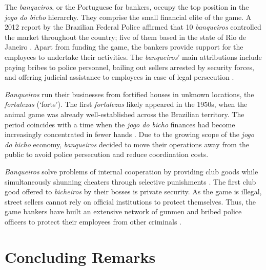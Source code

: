 \documentclass[a4paper,12pt]{article}
\begin{document}
The \textit{banqueiros}, or the Portuguese for bankers, occupy the top position in the \textit{jogo do bicho} hierarchy. They comprise the small financial elite of the game. A 2012 report by the Brazilian Federal Police affirmed that 10 \textit{banqueiros} controlled the market throughout the country; five of them based in the state of Rio de Janeiro \citep{globo2012contraventores}. Apart from funding the game, the bankers provide support for the employees to undertake their activities. The \textit{banqueiros}' main attributions include paying bribes to police personnel, bailing out sellers arrested by security forces, and offering judicial assistance to employees in case of legal persecution \citep[75]{labronici2012paratodos}.

\textit{Banqueiros} run their businesses from fortified houses in unknown locations, the \textit{fortalezas} (`forts'). The first \textit{fortalezas} likely appeared in the 1950s, when the animal game was already well-established across the Brazilian territory. The period coincides with a time when the \textit{jogo do bicho} finances had become increasingly concentrated in fewer hands \citep[259]{chazkel2011laws}. Due to the growing scope of the \textit{jogo do bicho} economy, \textit{banqueiros} decided to move their operations away from the public to avoid police persecution and reduce coordination costs.

\textit{Banqueiros} solve problems of internal cooperation by providing club goods \citep{buchanan1965economic} while simultaneously shunning cheaters through selective punishments \citep{bo2005cooperation, roth1978equilibrium}. The first club good offered to \textit{bicheiros} by their bosses is private security. As the game is illegal, street sellers cannot rely on official institutions to protect themselves. Thus, the game bankers have built an extensive network of gunmen and bribed police officers to protect their employees from other criminals \citetext{\citealp[48]{chinelli1993vazio}; \citealp[51]{labronici2012paratodos}}.





\section{Concluding Remarks}
\label{sec:conclusion3}
\end{document}
